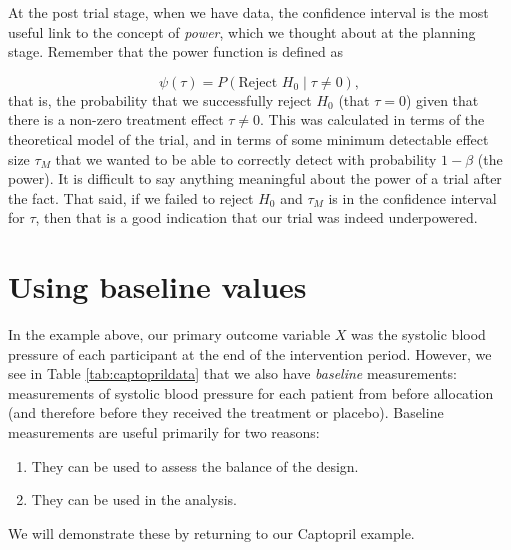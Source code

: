 \documentclass[
  openany]{book}
\providecommand{\tightlist}{%
  \setlength{\itemsep}{0pt}\setlength{\parskip}{0pt}}
\theoremstyle{definition}
\theoremstyle{definition}
\theoremstyle{definition}
\theoremstyle{definition}
\theoremstyle{remark}
\begin{document}
At the post trial stage, when we have data, the confidence interval is the most useful link to the concept of \emph{power}, which we thought about at the planning stage. Remember that the power function is defined as

\[\psi \left(\tau\right) = P\left(\text{Reject }H_0\mid \tau\neq 0\right),\] that is, the probability that we successfully reject \(H_0\) (that \(\tau=0\)) given that there is a non-zero treatment effect \(\tau\neq 0\). This was calculated in terms of the theoretical model of the trial, and in terms of some minimum detectable effect size \(\tau_M\) that we wanted to be able to correctly detect with probability \(1-\beta\) (the power). It is difficult to say anything meaningful about the power of a trial after the fact. That said, if we failed to reject \(H_0\) and \(\tau_M\) is in the confidence interval for \(\tau\), then that is a good indication that our trial was indeed underpowered.

\section{Using baseline values}\label{baseline}

In the example above, our primary outcome variable \(X\) was the systolic blood pressure of each participant at the end of the intervention period. However, we see in Table \ref{tab:captoprildata} that we also have \emph{baseline} measurements: measurements of systolic blood pressure for each patient from before allocation (and therefore before they received the treatment or placebo). Baseline measurements are useful primarily for two reasons:

\begin{enumerate}
\def\labelenumi{\arabic{enumi}.}
\tightlist
\item
  They can be used to assess the balance of the design.
\item
  They can be used in the analysis.
\end{enumerate}

We will demonstrate these by returning to our Captopril example.
\end{document}
